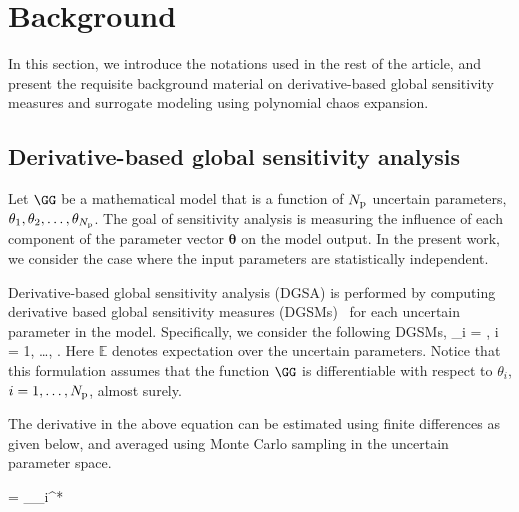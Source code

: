 \section{Background}
\label{sec:bg}

In this section, we introduce the notations used in the rest of
the article, and present the requisite background material on 
derivative-based global sensitivity measures and surrogate modeling 
using polynomial chaos expansion.




\subsection{Derivative-based global sensitivity analysis}  

Let $\GG$ be a mathematical model that is a function of ${N_\text{p}}$ uncertain 
parameters, $\theta_1, \theta_2, \ldots, \theta_{N_\text{p}}$. The goal of sensitivity analysis
is measuring the influence of each component of the parameter vector 
$\bm{\theta}$ on the model output. 
In the present work, we consider the case where the input parameters are statistically 
independent. 

Derivative-based global sensitivity analysis (DGSA) is performed by 
computing derivative based global sensitivity measures (DGSMs)~\cite{Sobol:2009} 
for each uncertain parameter in the model. 
Specifically, we consider the following DGSMs, 
\be
\mu_i = 
, \quad i = 1, \ldots, \Np.
\label{eq:mu}
\ee
Here $\mathbb{E}$ denotes expectation over the uncertain parameters.
Notice that this formulation assumes that the function $\GG$ is differentiable
with respect to $\theta_i$, $i = 1, \ldots, {N_\text{p}}$, almost surely.

The derivative in the above equation can be estimated using finite
differences as given below, and averaged using Monte Carlo sampling in
the uncertain parameter space. 


\be
{} =
 \lim_{\Delta\theta_i^{*}}
\label{eq:partial}
\ee

